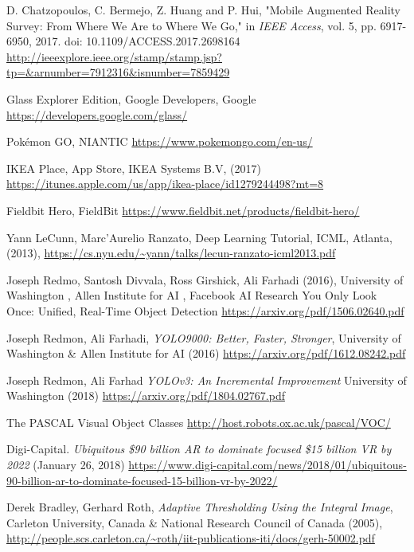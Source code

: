 \begin{thebibliography}{X}
D. Chatzopoulos, C. Bermejo, Z. Huang and P. Hui, "Mobile Augmented Reality Survey: From Where We Are to Where We Go," in \textit{IEEE Access}, vol. 5, pp. 6917-6950, 2017.
doi: 10.1109/ACCESS.2017.2698164
\url{http://ieeexplore.ieee.org/stamp/stamp.jsp?tp=&arnumber=7912316&isnumber=7859429}

Glass Explorer Edition, Google Developers, Google
\url{https://developers.google.com/glass/}

Pokémon GO, NIANTIC
\url{https://www.pokemongo.com/en-us/}


IKEA Place, App Store, IKEA Systems B.V, (2017)
\url{https://itunes.apple.com/us/app/ikea-place/id1279244498?mt=8}

Fieldbit Hero, FieldBit
\url{https://www.fieldbit.net/products/fieldbit-hero/}

Yann LeCunn, Marc'Aurelio Ranzato, Deep Learning Tutorial, ICML, Atlanta, (2013), 
\url{https://cs.nyu.edu/~yann/talks/lecun-ranzato-icml2013.pdf}

Joseph Redmo, Santosh Divvala, Ross Girshick, Ali Farhadi (2016), University of Washington
, Allen Institute for AI
, Facebook AI Research
You Only Look Once: Unified, Real-Time Object Detection
\url{https://arxiv.org/pdf/1506.02640.pdf} 

Joseph Redmon, Ali Farhadi, \textit{YOLO9000:
Better, Faster, Stronger}, 
University of Washington \& Allen Institute for AI (2016)
\url{https://arxiv.org/pdf/1612.08242.pdf}

Joseph Redmon, Ali Farhad
\textit{YOLOv3: An Incremental Improvement}
University of Washington (2018)
\url{https://arxiv.org/pdf/1804.02767.pdf}

The PASCAL Visual Object Classes
\url{http://host.robots.ox.ac.uk/pascal/VOC/}

Digi-Capital. \textit{Ubiquitous  \$90 billion AR to dominate focused \$15 billion VR by 2022}
(January 26, 2018)
\url{https://www.digi-capital.com/news/2018/01/ubiquitous-90-billion-ar-to-dominate-focused-15-billion-vr-by-2022/}

Derek Bradley, Gerhard Roth, \textit{Adaptive Thresholding Using the Integral Image},
Carleton University, Canada \& National Research Council of Canada (2005), 
\url{http://people.scs.carleton.ca/~roth/iit-publications-iti/docs/gerh-50002.pdf}

\end{thebibliography}

